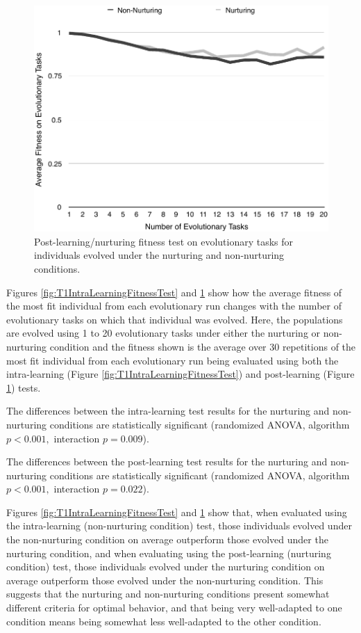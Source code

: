 \documentclass[master]{outhesis}
\begin{document}
\begin{figure}[h]
	\centering
	\includegraphics{NurturingFitnessTestPlot.pdf}
	\caption{Post-learning/nurturing fitness test on evolutionary tasks for individuals evolved under the nurturing and non-nurturing conditions.}
	\label{fig:T1PostLearningFitnessTest}
\end{figure}

Figures \ref{fig:T1IntraLearningFitnessTest} and \ref{fig:T1PostLearningFitnessTest} show how the average fitness of the most fit individual from each evolutionary run changes with the number of evolutionary tasks on which that individual was evolved.
Here,
the populations are evolved using 1 to 20 evolutionary tasks under either the nurturing or non-nurturing condition
and the fitness shown is the average over 30 repetitions of the most fit individual from each evolutionary run being evaluated
using both the intra-learning (Figure \ref{fig:T1IntraLearningFitnessTest}) 
and post-learning (Figure \ref{fig:T1PostLearningFitnessTest}) tests.

The differences between the intra-learning test results for the nurturing and non-nurturing conditions are statistically significant (randomized ANOVA, algorithm $p < 0.001,$ interaction $p = 0.009$).

The differences between the post-learning test results for the nurturing and non-nurturing conditions are statistically significant (randomized ANOVA, algorithm $p < 0.001,$ interaction $p = 0.022$).

Figures \ref{fig:T1IntraLearningFitnessTest} and \ref{fig:T1PostLearningFitnessTest} show that,
when evaluated using the intra-learning (non-nurturing condition) test,
those individuals evolved under the non-nurturing condition on average outperform those evolved under the nurturing condition,
and when evaluating using the post-learning (nurturing condition) test,
those individuals evolved under the nurturing condition on average outperform those evolved under the non-nurturing condition.
This suggests that the nurturing and non-nurturing conditions present somewhat different criteria for optimal behavior,
and that being very well-adapted to one condition means being somewhat less well-adapted to the other condition.
\end{document}
